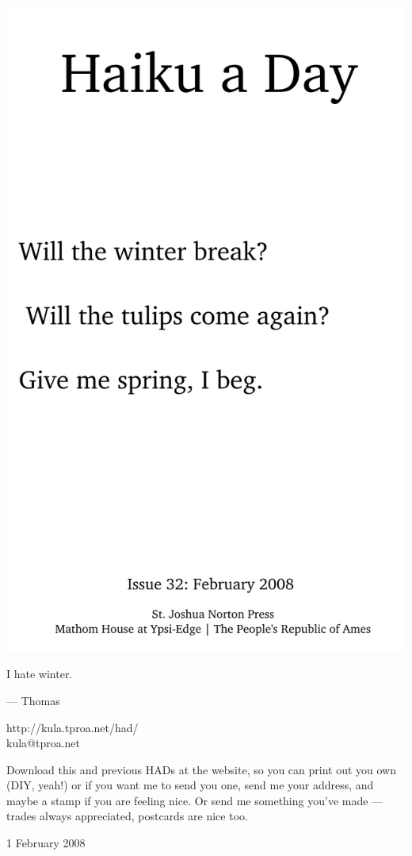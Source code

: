 \documentclass[12pt]{article}
\begin{document}
\includegraphics{frontpage.png}

\newpage

I hate winter.

--- Thomas

http://kula.tproa.net/had/ \\
kula@tproa.net

Download this and previous HADs at the website, so you can
print out you own (DIY, yeah!) or if you want me to send
you one, send me your address, and maybe a stamp if you
are feeling nice. Or send me something you've made ---
trades always appreciated, postcards are nice too.


1 February 2008
\end{document}

